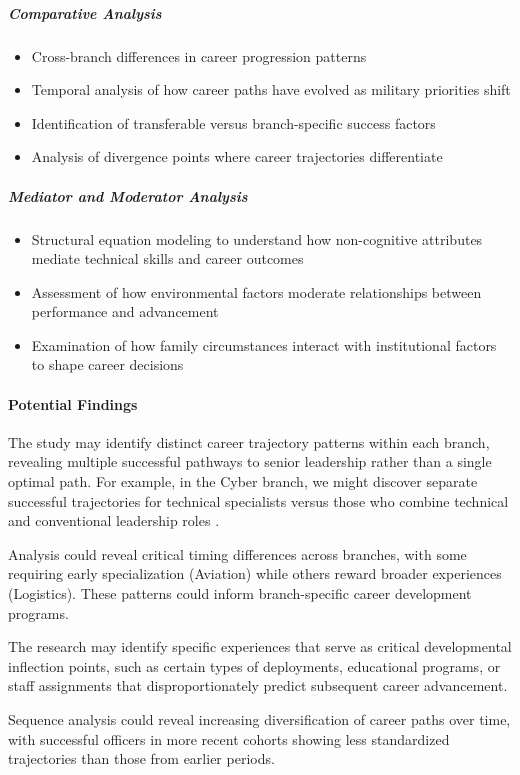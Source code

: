 \documentclass[../main.tex]{subfiles}
\begin{document}
\subparagraph{Comparative Analysis}
\begin{itemize}
\item Cross-branch differences in career progression patterns
\item Temporal analysis of how career paths have evolved as military priorities shift
\item Identification of transferable versus branch-specific success factors
\item Analysis of divergence points where career trajectories differentiate
\end{itemize}

\subparagraph{Mediator and Moderator Analysis}
\begin{itemize}
\item Structural equation modeling to understand how non-cognitive attributes mediate technical skills and career outcomes
\item Assessment of how environmental factors moderate relationships between performance and advancement
\item Examination of how family circumstances interact with institutional factors to shape career decisions
\end{itemize}

\paragraph{Potential Findings}

The study may identify distinct career trajectory patterns within each branch, revealing multiple successful pathways to senior leadership rather than a single optimal path. For example, in the Cyber branch, we might discover separate successful trajectories for technical specialists versus those who combine technical and conventional leadership roles \citep{joseph2012career}.

Analysis could reveal critical timing differences across branches, with some requiring early specialization (Aviation) while others reward broader experiences (Logistics). These patterns could inform branch-specific career development programs.

The research may identify specific experiences that serve as critical developmental inflection points, such as certain types of deployments, educational programs, or staff assignments that disproportionately predict subsequent career advancement.

Sequence analysis could reveal increasing diversification of career paths over time, with successful officers in more recent cohorts showing less standardized trajectories than those from earlier periods.
\end{document}
